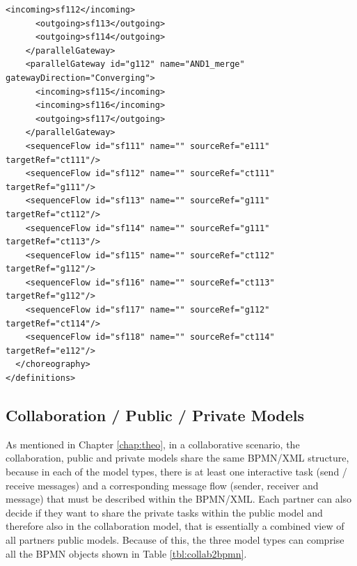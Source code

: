 \begin{lstlisting}[caption={BPMN Choreography Model Example},captionpos=b, label={lst:choreobpmnex}]
      <incoming>sf112</incoming>
      <outgoing>sf113</outgoing>
      <outgoing>sf114</outgoing>
    </parallelGateway>
    <parallelGateway id="g112" name="AND1_merge" gatewayDirection="Converging">
      <incoming>sf115</incoming>
      <incoming>sf116</incoming>
      <outgoing>sf117</outgoing>
    </parallelGateway>
    <sequenceFlow id="sf111" name="" sourceRef="e111" targetRef="ct111"/>
    <sequenceFlow id="sf112" name="" sourceRef="ct111" targetRef="g111"/>
    <sequenceFlow id="sf113" name="" sourceRef="g111" targetRef="ct112"/>
    <sequenceFlow id="sf114" name="" sourceRef="g111" targetRef="ct113"/>
    <sequenceFlow id="sf115" name="" sourceRef="ct112" targetRef="g112"/>
    <sequenceFlow id="sf116" name="" sourceRef="ct113" targetRef="g112"/>
    <sequenceFlow id="sf117" name="" sourceRef="g112" targetRef="ct114"/>
    <sequenceFlow id="sf118" name="" sourceRef="ct114" targetRef="e112"/>
  </choreography>
</definitions>
\end{lstlisting}

\subsection{Collaboration / Public / Private Models}

As mentioned in Chapter \ref{chap:theo}, in a collaborative scenario, the collaboration, public and private models share the same BPMN/XML structure, because in each of the model types, there is at least one interactive task (send / receive messages) and a corresponding message flow (sender, receiver and message) that must be described within the BPMN/XML. Each partner can also decide if they want to share the private tasks within the public model and therefore also in the collaboration model, that is essentially a combined view of all partners public models. Because of this, the three model types can comprise all the BPMN objects shown in Table \ref{tbl:collab2bpmn}.


